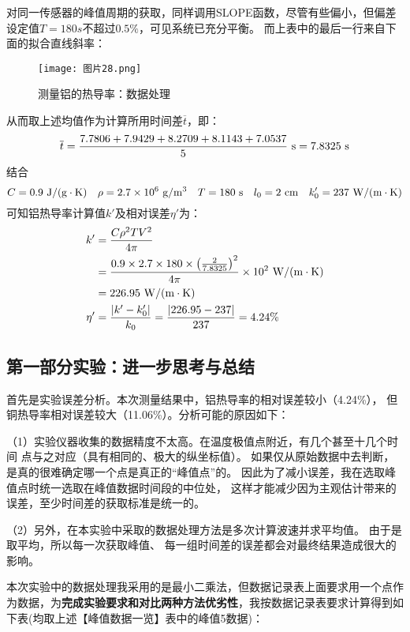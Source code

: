 \documentclass[11pt]{article}
\begin{document}
对同一传感器的峰值周期的获取，同样调用SLOPE函数，尽管有些偏小，但偏差设定值$T=180s$不超过$0.5\%$，可见系统已充分平衡。
而上表中的最后一行来自下面的拟合直线斜率：
\begin{figure}[H]
    \centering
    \texttt{[image: 图片28.png]}
    \caption{测量铝的热导率：数据处理}
\end{figure}


从而取上述均值作为计算所用时间差$\overline t$，即：
\[
  \overline t= \frac{7.7806  + 7.9429  + 8.2709  + 8.1143  + 7.0537 }{5}\,\,{\rm s} =7.8325\,\,{\rm s}
\]
结合
\[
  C=0.9\,\,{\rm J/(g\cdot  K)}\quad \rho=2.7\times10^{6}\,\,{\rm g/m^3}\quad T=180\,\,{\rm s}   \quad l_0=2\,\,{\rm cm}\quad k'_0=237\,\,{\rm W/(m\cdot K)}
\]
可知铝热导率计算值$k'$及相对误差$\eta'$为：
\begin{align*}
    k'&=\frac{C\rho^2TV^2}{4\pi}\\&=\frac{0.9\times2.7\times180\times \left(\frac{2}{7.8325}\right)^2}{4\pi}\times 10^2\,\,{\rm W/(m\cdot K)}\\&=226.95\,\,{\rm W/(m\cdot K)}\\
    \eta'&=\frac{|k'-k'_0|}{k_0}=\frac{|226.95-237|}{237}=4.24 \%
\end{align*}


\subsection{第一部分实验：进一步思考与总结}

首先是实验误差分析。本次测量结果中，铝热导率的相对误差较小（4.24\%），
但铜热导率相对误差较大（11.06\%）。分析可能的原因如下：

（1）实验仪器收集的数据精度不太高。在温度极值点附近，有几个甚至十几个时间
点与之对应（具有相同的、极大的纵坐标值）。
如果仅从原始数据中去判断，是真的很难确定哪一个点是真正的“峰值点”的。
因此为了减小误差，我在选取峰值点时统一选取在峰值数据时间段的中位处，
这样才能减少因为主观估计带来的误差，至少时间差的获取标准是统一的。

（2）另外，在本实验中采取的数据处理方法是多次计算波速并求平均值。
由于是取平均，所以每一次获取峰值、
每一组时间差的误差都会对最终结果造成很大的影响。

本次实验中的数据处理我采用的是最小二乘法，但数据记录表上面要求用一个点作为数据，为\textbf{完成实验要求和对比两种方法优劣性}，我按数据记录表要求计算得到如下表(均取上述【峰值数据一览】表中的峰值5数据)：
\end{document}
